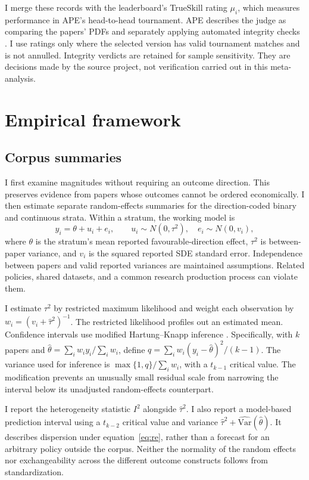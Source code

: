 \documentclass[11pt]{article}
\begin{document}
I merge these records with the leaderboard's TrueSkill rating $\mu_i$, which measures performance in APE's head-to-head tournament. APE describes the judge as comparing the papers' PDFs and separately applying automated integrity checks \citep{methodology}. I use ratings only where the selected version has valid tournament matches and is not annulled. Integrity verdicts are retained for sample sensitivity. They are decisions made by the source project, not verification carried out in this meta-analysis.

\section{Empirical framework}\label{sec:methods}
\subsection{Corpus summaries}
I first examine magnitudes without requiring an outcome direction. This preserves evidence from papers whose outcomes cannot be ordered economically. I then estimate separate random-effects summaries for the direction-coded binary and continuous strata. Within a stratum, the working model is
\begin{equation}\label{eq:re}
 y_i=\theta+u_i+e_i,\qquad
 u_i\sim N(0,\tau^2),\quad e_i\sim N(0,v_i),
\end{equation}
where $\theta$ is the stratum's mean reported favourable-direction effect, $\tau^2$ is between-paper variance, and $v_i$ is the squared reported SDE standard error. Independence between papers and valid reported variances are maintained assumptions. Related policies, shared datasets, and a common research production process can violate them.

I estimate $\tau^2$ by restricted maximum likelihood \citep{viechtbauer} and weight each observation by $w_i=(v_i+\widehat\tau^2)^{-1}$. The restricted likelihood profiles out an estimated mean. Confidence intervals use modified Hartung--Knapp inference \citep{rover}. Specifically, with $k$ papers and $\widehat\theta=\sum_i w_i y_i/\sum_i w_i$, define $q=\sum_iw_i(y_i-\widehat\theta)^2/(k-1)$. The variance used for inference is $\max\{1,q\}/\sum_iw_i$, with a $t_{k-1}$ critical value. The modification prevents an unusually small residual scale from narrowing the interval below its unadjusted random-effects counterpart.

I report the heterogeneity statistic $I^2$ alongside $\widehat\tau^2$. I also report a model-based prediction interval using a $t_{k-2}$ critical value and variance $\widehat\tau^2+\widehat{\mathrm{Var}}(\widehat\theta)$. It describes dispersion under equation~\eqref{eq:re}, rather than a forecast for an arbitrary policy outside the corpus. Neither the normality of the random effects nor exchangeability across the different outcome constructs follows from standardization.
\end{document}
